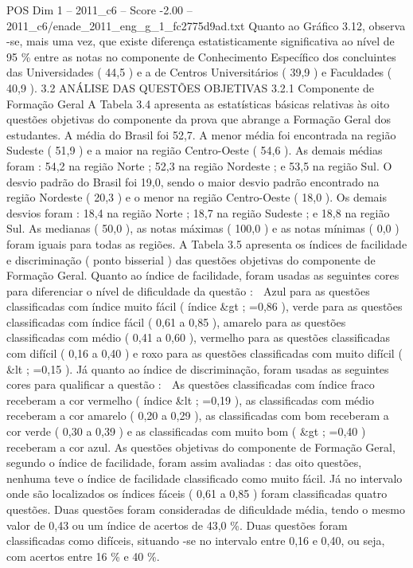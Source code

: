 \begin{textsample}{POS Dim 1 – 2011\_c6 – Score -2.00 – 2011\_c6/enade\_2011\_eng\_g\_1\_fc2775d9ad.txt}
Quanto ao Gráfico 3.12, observa -se, mais uma vez, que existe diferença estatisticamente significativa ao nível de 95 \% entre as notas no componente de Conhecimento Específico dos concluintes das Universidades ( 44,5 ) e a de Centros Universitários ( 39,9 ) e Faculdades ( 40,9 ). 3.2 ANÁLISE DAS QUESTÕES OBJETIVAS 3.2.1 Componente de Formação Geral A Tabela 3.4 apresenta as estatísticas básicas relativas às oito questões objetivas do componente da prova que abrange a Formação Geral dos estudantes.
A média do Brasil foi 52,7.
A menor média foi encontrada na região Sudeste ( 51,9 ) e a maior na região Centro-Oeste ( 54,6 ).
As demais médias foram : 54,2 na região Norte ; 52,3 na região Nordeste ; e 53,5 na região Sul.
O desvio padrão do Brasil foi 19,0, sendo o maior desvio padrão encontrado na região Nordeste ( 20,3 ) e o menor na região Centro-Oeste ( 18,0 ).
Os demais desvios foram : 18,4 na região Norte ; 18,7 na região Sudeste ; e 18,8 na região Sul.
As medianas ( 50,0 ), as notas máximas ( 100,0 ) e as notas mínimas ( 0,0 ) foram iguais para todas as regiões.
A Tabela 3.5 apresenta os índices de facilidade e discriminação ( ponto bisserial ) das questões objetivas do componente de Formação Geral.
Quanto ao índice de facilidade, foram usadas as seguintes cores para diferenciar o nível de dificuldade da questão :  Azul para as questões classificadas com índice muito fácil ( índice \&gt ; =0,86 ), verde para as questões classificadas com índice fácil ( 0,61 a 0,85 ), amarelo para as questões classificadas com médio ( 0,41 a 0,60 ), vermelho para as questões classificadas com difícil ( 0,16 a 0,40 ) e roxo para as questões classificadas com muito difícil ( \&lt ; =0,15 ).
Já quanto ao índice de discriminação, foram usadas as seguintes cores para qualificar a questão :  As questões classificadas com índice fraco receberam a cor vermelho ( índice \&lt ; =0,19 ), as classificadas com médio receberam a cor amarelo ( 0,20 a 0,29 ), as classificadas com bom receberam a cor verde ( 0,30 a 0,39 ) e as classificadas com muito bom ( \&gt ; =0,40 ) receberam a cor azul.
As questões objetivas do componente de Formação Geral, segundo o índice de facilidade, foram assim avaliadas : das oito questões, nenhuma teve o índice de facilidade classificado como muito fácil.
Já no intervalo onde são localizados os índices fáceis ( 0,61 a 0,85 ) foram classificadas quatro questões.
Duas questões foram consideradas de dificuldade média, tendo o mesmo valor de 0,43 ou um índice de acertos de 43,0 \%.
Duas questões foram classificadas como difíceis, situando -se no intervalo entre 0,16 e 0,40, ou seja, com acertos entre 16 \% e 40 \%.

\end{textsample}
